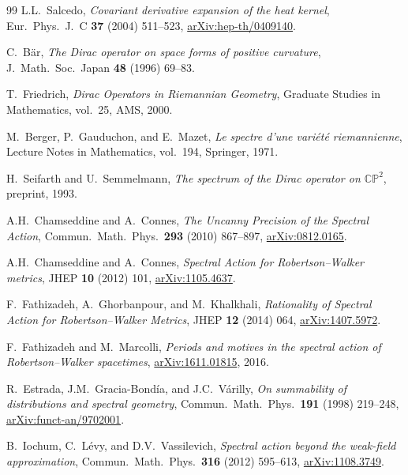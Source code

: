 \documentclass[11pt,a4paper]{article}
\begin{document}
\begin{thebibliography}{99}
L.L.~Salcedo,
\textit{Covariant derivative expansion of the heat kernel},
Eur.\ Phys.\ J.~C \textbf{37} (2004) 511--523,
\href{https://arxiv.org/abs/hep-th/0409140}{arXiv:hep-th/0409140}.

C.~B\"{a}r,
\textit{The Dirac operator on space forms of positive curvature},
J.\ Math.\ Soc.\ Japan \textbf{48} (1996) 69--83.

T.~Friedrich,
\textit{Dirac Operators in Riemannian Geometry},
Graduate Studies in Mathematics, vol.~25, AMS, 2000.

M.~Berger, P.~Gauduchon, and E.~Mazet,
\textit{Le spectre d'une vari\'{e}t\'{e} riemannienne},
Lecture Notes in Mathematics, vol.~194, Springer, 1971.

H.~Seifarth and U.~Semmelmann,
\textit{The spectrum of the Dirac operator on
$\mathbb{CP}^2$},
preprint, 1993.

A.H.~Chamseddine and A.~Connes,
\textit{The Uncanny Precision of the Spectral Action},
Commun.\ Math.\ Phys.\ \textbf{293} (2010) 867--897,
\href{https://arxiv.org/abs/0812.0165}{arXiv:0812.0165}.

A.H.~Chamseddine and A.~Connes,
\textit{Spectral Action for Robertson--Walker metrics},
JHEP \textbf{10} (2012) 101,
\href{https://arxiv.org/abs/1105.4637}{arXiv:1105.4637}.

F.~Fathizadeh, A.~Ghorbanpour, and M.~Khalkhali,
\textit{Rationality of Spectral Action for Robertson--Walker Metrics},
JHEP \textbf{12} (2014) 064,
\href{https://arxiv.org/abs/1407.5972}{arXiv:1407.5972}.

F.~Fathizadeh and M.~Marcolli,
\textit{Periods and motives in the spectral action of Robertson--Walker
spacetimes},
\href{https://arxiv.org/abs/1611.01815}{arXiv:1611.01815}, 2016.

R.~Estrada, J.M.~Gracia-Bond\'{i}a, and J.C.~V\'{a}rilly,
\textit{On summability of distributions and spectral geometry},
Commun.\ Math.\ Phys.\ \textbf{191} (1998) 219--248,
\href{https://arxiv.org/abs/funct-an/9702001}{arXiv:funct-an/9702001}.

B.~Iochum, C.~L\'{e}vy, and D.V.~Vassilevich,
\textit{Spectral action beyond the weak-field approximation},
Commun.\ Math.\ Phys.\ \textbf{316} (2012) 595--613,
\href{https://arxiv.org/abs/1108.3749}{arXiv:1108.3749}.


\end{thebibliography}
\end{document}

